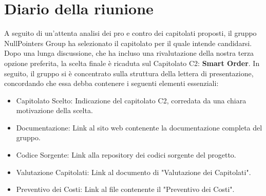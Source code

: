 \section{Diario della riunione}

A seguito di un'attenta analisi dei pro e contro dei capitolati proposti, il gruppo NullPointers Group ha selezionato il capitolato per il quale intende candidarsi.
Dopo una lunga discussione, che ha incluso una rivalutazione della nostra terza opzione preferita, la scelta finale è ricaduta sul Capitolato C2: \textbf{Smart Order}.
In seguito, il gruppo si è concentrato sulla struttura della lettera di presentazione, concordando che essa debba contenere i seguenti elementi essenziali:
\begin{itemize}
	\item Capitolato Scelto: Indicazione del capitolato C2, corredata da una chiara motivazione della scelta.
	\item Documentazione: Link al sito web contenente la documentazione completa del gruppo.
	\item Codice Sorgente: Link alla repository dei codici sorgente del progetto.
	\item Valutazione Capitolati: Link al documento di "Valutazione dei Capitolati".
	\item Preventivo dei Costi: Link al file contenente il "Preventivo dei Costi".
\end{itemize}